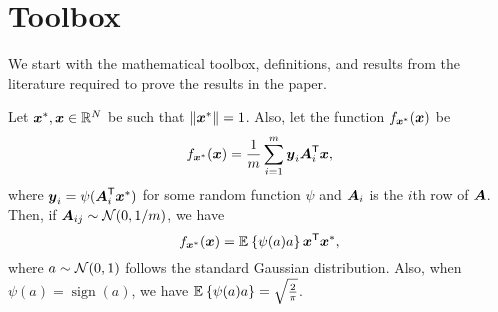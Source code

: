 \documentclass[journal]{IEEEtran}
\DeclareMathOperator{\sign}{sign}
\begin{document}
\appendices
{}

\section{Toolbox}
We start with the mathematical toolbox, definitions, and results from the literature required to prove the results in the paper.

\begin{lemma}\label{lem:lambda}
Let $\boldsymbol{x}^*,\boldsymbol{x}\in\mathbb{R}^N$ be such that $\left\Vert\boldsymbol{x}^*\right\Vert= 1$. Also, let the function $f_{\boldsymbol{x}^*}(\boldsymbol{x})$ be
\begin{equation}\label{eq:f_fnt}
 f_{\boldsymbol{x}^*}(\boldsymbol{x})   = \frac{1}{m}\sum_{i=1}^m\boldsymbol{y}_i\boldsymbol{A}_i^{\mathsf{T}}\boldsymbol{x},
\end{equation}
where $\boldsymbol{y}_i=\psi(\boldsymbol{A}_i^{\mathsf{T}}\boldsymbol{x}^*)$ for some random function $\psi$ and $\boldsymbol{A}_i$ is the $i$th row of $\boldsymbol{A}$. 
Then,  if $\boldsymbol{A}_{ij}\sim\mathcal{N}(0,1/m)$, we have
\begin{equation}\label{eq:expect}
f_{\vecx^*}(\vecx) = \expect{}{\psi(a)a}\vecx\tran\vecx^*,%
\end{equation}
where $a\sim\mathcal{N}(0,1)$ follows the standard Gaussian distribution. Also, when $\psi(a)=\sign(a)$, we have $\mathbb{E}_{}\left\{\psi(a)a\right\} = 
        \sqrt{\frac{2}{\pi}}$.
\end{lemma}
\end{document}
